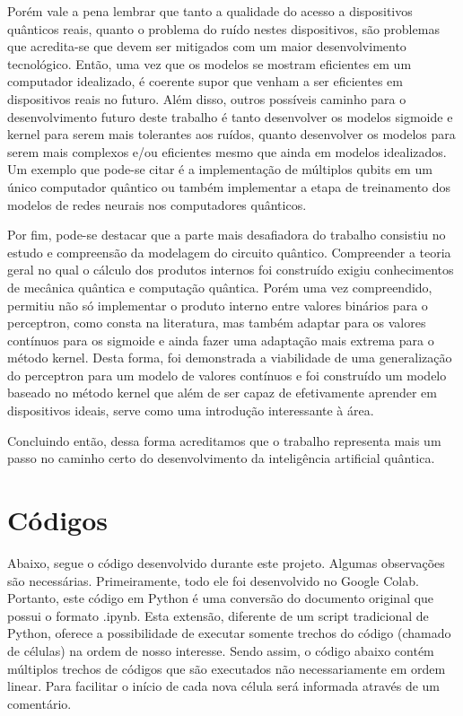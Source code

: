 Porém vale a pena lembrar que tanto a qualidade do acesso a dispositivos quânticos reais, quanto o problema do ruído nestes dispositivos, são problemas que acredita-se que devem ser mitigados com um maior desenvolvimento tecnológico. Então, uma vez que os modelos se mostram eficientes em um computador idealizado, é coerente supor que venham a ser eficientes em dispositivos reais no futuro. Além disso, outros possíveis caminho para o desenvolvimento futuro deste trabalho é tanto desenvolver os modelos sigmoide e kernel para serem mais tolerantes aos ruídos, quanto desenvolver os modelos para serem mais complexos e/ou eficientes mesmo que ainda em modelos idealizados. Um exemplo que pode-se citar é a implementação de múltiplos qubits em um único computador quântico ou também implementar a etapa de treinamento dos modelos de redes neurais nos computadores quânticos.

Por fim, pode-se destacar que a parte mais desafiadora do trabalho consistiu no estudo e compreensão da modelagem do circuito quântico. Compreender a teoria geral no qual o cálculo dos produtos internos foi construído exigiu conhecimentos de mecânica quântica e computação quântica. Porém uma vez compreendido, permitiu não só implementar o produto interno entre valores binários para o perceptron, como consta na literatura, mas também adaptar para os valores contínuos para os sigmoide e ainda fazer uma adaptação mais extrema para o método kernel. Desta forma, foi demonstrada a viabilidade de uma generalização do perceptron para um modelo de valores contínuos e foi construído um modelo baseado no método kernel que além de ser capaz de efetivamente aprender em dispositivos ideais, serve como uma introdução interessante à área.

Concluindo então, dessa forma acreditamos que o trabalho representa mais um passo no caminho certo do desenvolvimento da inteligência artificial quântica.


\apendice 

\chapter{Códigos}

Abaixo, segue o código desenvolvido durante este projeto. Algumas observações são necessárias. Primeiramente, todo ele foi desenvolvido no Google Colab. Portanto, este código em Python é uma conversão do documento original que possui o formato .ipynb. Esta extensão, diferente de um script tradicional de Python, oferece a possibilidade de executar somente trechos do código (chamado de células) na ordem de nosso interesse. Sendo assim, o código abaixo contém múltiplos trechos de códigos que são executados não necessariamente em ordem linear. Para facilitar o início de cada nova célula será informada através de um comentário.

